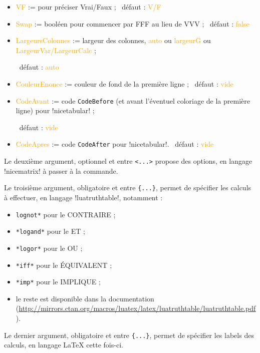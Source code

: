 \documentclass[french,a4paper,11pt]{article}
\newcommand\Cle[1]{{\small\sffamily\textlangle \textcolor{orange}{#1}\textrangle}}
\begin{document}
{{\begin{tipblock}
\begin{itemize}
	\item \Cle{VF} := pour préciser Vrai/Faux ; \hfill~défaut : \Cle{V/F}
	\item \Cle{Swap} := booléen pour commencer par FFF au lieu de VVV ; \hfill~défaut : \Cle{false}
	\item \Cle{LargeursColonnes} := largeur des colonnes, \Cle{auto} ou \Cle{largeurG} ou \Cle{LargeurVar/LargeurCalc} ;
	
	\hfill~défaut : \Cle{auto}
	\item \Cle{CouleurEnonce} := couleur de fond de la première ligne ; \hfill~défaut : \Cle{vide}
	\item \Cle{CodeAvant} := code \texttt{CodeBefore} (et avant l'éventuel coloriage de la première ligne) pour \motcletex!nicetabular! ;
	
	\hfill~défaut : \Cle{vide}
	\item \Cle{CodeApres} := code \texttt{CodeAfter} pour \motcletex!nicetabular!. \hfill~défaut : \Cle{vide}
\end{itemize}

Le deuxième argument, optionnel et entre \texttt{<...>} propose des options, en langage \packagetex!nicematrix! à passer à la commande.
\end{tipblock}

\pagebreak

\begin{tipblock}
Le troisième argument, obligatoire et entre \texttt{\{...\}}, permet de spécifier les calculs à effectuer, en langage \motcletex!luatruthtable!, notamment :

\begin{itemize}
	\item \texttt{lognot*} pour le \textsf{CONTRAIRE} ;
	\item \texttt{*logand*} pour le \textsf{ET} ;
	\item \texttt{*logor*} pour le \textsf{OU} ;
	\item \texttt{*iff*} pour le \textsf{ÉQUIVALENT} ;
	\item \texttt{*imp*} pour le \textsf{IMPLIQUE} ;
	\item le reste est disponible dans la documentation (\url{http://mirrors.ctan.org/macros/luatex/latex/luatruthtable/luatruthtable.pdf}).
\end{itemize}

Le dernier argument, obligatoire et entre \texttt{\{...\}}, permet de spécifier les labels des calculs, en langage \LaTeX{} cette fois-ci.
\end{tipblock}

}}
\end{document}
